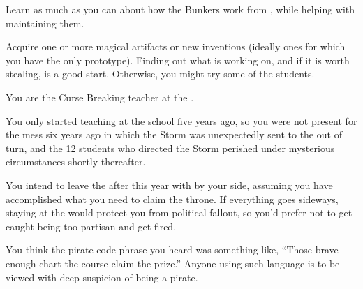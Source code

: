 \documentclass[char]{GL2020}
\begin{document}
\begin{itemz}
   \item Learn as much as you can about how the Bunkers work from \cBunker{}, while helping with maintaining them.
    \item Acquire one or more magical artifacts or new inventions (ideally ones for which you have the only prototype). Finding out what \cCurse{} is working on, and if it is worth stealing, is a good start. Otherwise, you might try some of the \pTech{} students.
\end{itemz}

\begin{itemz}[Notes]
    \item You are the Curse Breaking teacher at the \pSchool{}.
    \item You only started teaching at the school five years ago, so you were not present for the mess six years ago in which the Storm was unexpectedly sent to the \pShip{} out of turn, and the 12 students who directed the Storm perished under mysterious circumstances shortly thereafter.
    \item You intend to leave the \pSchool{} after this year with \cPirate{} by your side, assuming you have accomplished what you need to claim the throne. If everything goes sideways, staying at the \pSc{} would protect you from political fallout, so you’d prefer not to get caught being too partisan and get fired.
    \item You think the pirate code phrase you heard was something like, ``Those brave enough chart the course claim the prize.'' Anyone using such language is to be viewed with deep suspicion of being a pirate.
\end{itemz}
\end{document}
